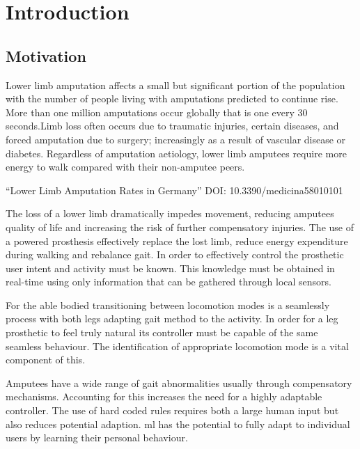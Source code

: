 \chapter{Introduction}
\label{chp:intro}

\section{Motivation}
Lower limb amputation affects a small but significant portion of the population with the number of people living with amputations predicted to continue rise. More than one million amputations occur globally that is one every 30 seconds.\cite{Asif2021}Limb loss often occurs due to traumatic injuries, certain diseases, and forced amputation due to surgery; increasingly as a result of vascular disease or diabetes\cite{Griffin2012}. Regardless of amputation aetiology, lower limb amputees require more energy to walk compared with their non-amputee peers\cite{Vllasolli2014}.

``Lower Limb Amputation Rates in Germany'' DOI: 10.3390/medicina58010101

The loss of a lower limb dramatically impedes movement\cite{Gregg2014, Wong2021, Srisuwan2021}, reducing amputees quality of life and increasing the risk of further compensatory injuries. The use of a powered prosthesis effectively replace the lost limb, reduce energy expenditure during walking and rebalance gait\cite{Lin2014}. In order to effectively control the prosthetic user intent and activity must be known. This knowledge must be obtained in real-time using only information that can be gathered through local sensors.

For the able bodied transitioning between locomotion modes is a seamlessly process with both legs adapting gait method to the activity. In order for a leg prosthetic to feel truly natural its controller must be capable of the same seamless behaviour. The identification of appropriate locomotion mode is a vital component of this. 

Amputees have a wide range of gait abnormalities usually through compensatory mechanisms\cite{Tucker2015}. Accounting for this increases the need for a highly adaptable controller. The use of hard coded rules requires both a large human input but also reduces potential adaption. \acrfull{ml} has the potential to fully adapt to individual users by learning their personal behaviour.



